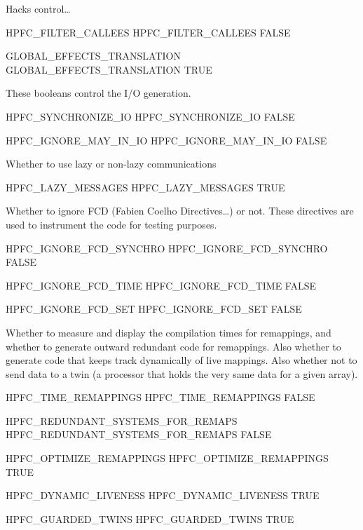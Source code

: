 \documentclass[a4paper]{report}
\begin{document}
   Hacks control\ldots

\begin{PipsProp}{HPFC_FILTER_CALLEES}
HPFC_FILTER_CALLEES FALSE
\end{PipsProp}
\begin{PipsProp}{GLOBAL_EFFECTS_TRANSLATION}
GLOBAL_EFFECTS_TRANSLATION TRUE
\end{PipsProp}

  These booleans control the I/O generation.

\begin{PipsProp}{HPFC_SYNCHRONIZE_IO}
HPFC_SYNCHRONIZE_IO FALSE
\end{PipsProp}
\begin{PipsProp}{HPFC_IGNORE_MAY_IN_IO}
HPFC_IGNORE_MAY_IN_IO FALSE
\end{PipsProp}

  Whether to use lazy or non-lazy communications

\begin{PipsProp}{HPFC_LAZY_MESSAGES}
HPFC_LAZY_MESSAGES TRUE
\end{PipsProp}

Whether to ignore FCD (Fabien Coelho Directives\ldots) or not. These
directives are used to instrument the code for testing purposes.

\begin{PipsProp}{HPFC_IGNORE_FCD_SYNCHRO}
HPFC_IGNORE_FCD_SYNCHRO FALSE
\end{PipsProp}
\begin{PipsProp}{HPFC_IGNORE_FCD_TIME}
HPFC_IGNORE_FCD_TIME FALSE
\end{PipsProp}
\begin{PipsProp}{HPFC_IGNORE_FCD_SET}
HPFC_IGNORE_FCD_SET FALSE
\end{PipsProp}

Whether to measure and display the compilation times for remappings,
and whether to generate outward redundant code for remappings. Also
whether to generate code that keeps track dynamically of live mappings.
Also whether not to send data to a twin (a processor that holds the very
same data for a given array).

\begin{PipsProp}{HPFC_TIME_REMAPPINGS}
HPFC_TIME_REMAPPINGS FALSE
\end{PipsProp}
\begin{PipsProp}{HPFC_REDUNDANT_SYSTEMS_FOR_REMAPS}
HPFC_REDUNDANT_SYSTEMS_FOR_REMAPS FALSE
\end{PipsProp}
\begin{PipsProp}{HPFC_OPTIMIZE_REMAPPINGS}
HPFC_OPTIMIZE_REMAPPINGS TRUE
\end{PipsProp}
\begin{PipsProp}{HPFC_DYNAMIC_LIVENESS}
HPFC_DYNAMIC_LIVENESS TRUE
\end{PipsProp}
\begin{PipsProp}{HPFC_GUARDED_TWINS}
HPFC_GUARDED_TWINS TRUE
\end{PipsProp}
\end{document}
